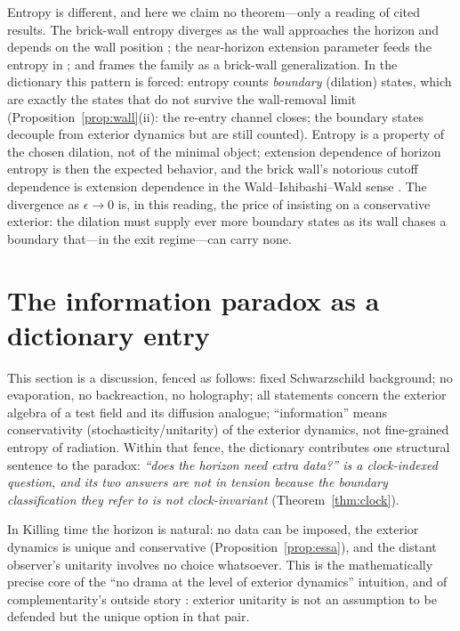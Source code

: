 \documentclass[11pt]{article}
\theoremstyle{definition}
\theoremstyle{remark}
\begin{document}
Entropy is different, and here we claim no theorem---only a reading
of cited results. The brick-wall entropy diverges as the wall
approaches the horizon and depends on the wall position
\cite{tHooftBrickWall1985}; the near-horizon extension parameter
feeds the entropy in
\cite{GuptaSen2002,CamblongOrdonez2005,CamblongOrdonez2007}; and
\cite{Balachandran2018} frames the family as a brick-wall
generalization. In the dictionary this pattern is forced: entropy
counts \emph{boundary} (dilation) states, which are exactly the
states that do not survive the wall-removal limit
(Proposition~\ref{prop:wall}(ii): the re-entry channel closes; the
boundary states decouple from exterior dynamics but are still
counted). Entropy is a property of the chosen dilation, not of the
minimal object; extension dependence of horizon entropy is then the
expected behavior, and the brick wall's notorious cutoff dependence
is extension dependence in the Wald--Ishibashi--Wald sense
\cite{Wald1980,IshibashiWald2003}. The divergence as
$\epsilon\to0$ is, in this reading, the price of insisting on a
conservative exterior: the dilation must supply ever more boundary
states as its wall chases a boundary that---in the exit regime---can
carry none.

\section{The information paradox as a dictionary entry}
\label{sec:info}

This section is a discussion, fenced as follows: fixed Schwarzschild
background; no evaporation, no backreaction, no holography; all
statements concern the exterior algebra of a test field and its
diffusion analogue; ``information'' means conservativity
(stochasticity/unitarity) of the exterior dynamics, not fine-grained
entropy of radiation. Within that fence, the dictionary contributes
one structural sentence to the paradox: \emph{``does the horizon need
extra data?'' is a clock-indexed question, and its two answers are
not in tension because the boundary classification they refer to is
not clock-invariant} (Theorem~\ref{thm:clock}).

In Killing time the horizon is natural: no data can be imposed, the
exterior dynamics is unique and conservative
(Proposition~\ref{prop:essa}), and the distant observer's unitarity
involves no choice whatsoever. This is the mathematically precise
core of the ``no drama at the level of exterior dynamics'' intuition,
and of complementarity's outside story \cite{STU1993}: exterior
unitarity is not an assumption to be defended but the unique option
in that pair.
\end{document}
